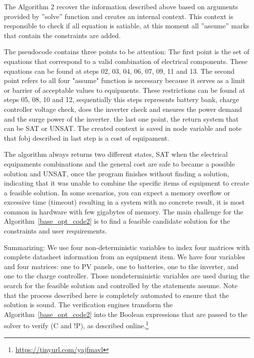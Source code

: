 \documentclass[10pt,journal,compsoc]{IEEEtran}
\begin{document}
The Algorithm 2 recover the information described above based on arguments provided by ”solve” function and creates an internal context. This context is responsible to check if all equation is satiable, at this moment all ”assume” marks that contain the constraints are added.

The pseudocode contains three points to be attention: The first point is the set of equations that correspond to a valid combination of electrical components. These equations can be found at steps 02, 03, 04, 06, 07, 09, 11 and 13. The second point refers to all four "assume" function is necessary because it serves as a limit or barrier of acceptable values to equipments. These restrictions can be found at steps 05, 08, 10 and 12, sequentially this steps represents battery bank, charge controller voltage check, does the inverter check and ensures the power demand and the surge power of the inverter. the last one point, the return system that can be SAT or UNSAT. The created context is saved in node variable and note that fobj described in last step is a cost of equipament.

The algorithm always returns two different states, SAT when the electrical equipaments combinations and the general cost are safe to became a possible solution and  UNSAT, once the program finishes without finding a solution, indicating that it was unable to combine the specific items of equipment to create a feasible solution. In some scenarios, you can expect a memory overflow or excessive time (timeout) resulting in a system with no concrete result, it is most common in hardware with few gigabytes of memory. The main challenge for the Algorithm~\ref{base_opt_code2} is to find a feasible candidate solution for the constraints and user requirements.

Summarizing: We use four non-deterministic variables
to index four matrices with complete datasheet information from an equipment item. We have four variables and four matrices: one to PV panels, one to batteries, one to the inverter, and one to the charge controller. Those nondeterministic variables are used during the search for the feasible solution and controlled by the statements assume. Note that the process described here is completely automated to ensure that the solution is sound. The verification engines transform the Algorithm~\ref{base_opt_code2} into the Boolean expressions that are passed to the solver to verify (C and !P), as described online.\footnote{\url{https://tinyurl.com/yajfmavl}}

\color{black}
\end{document}
